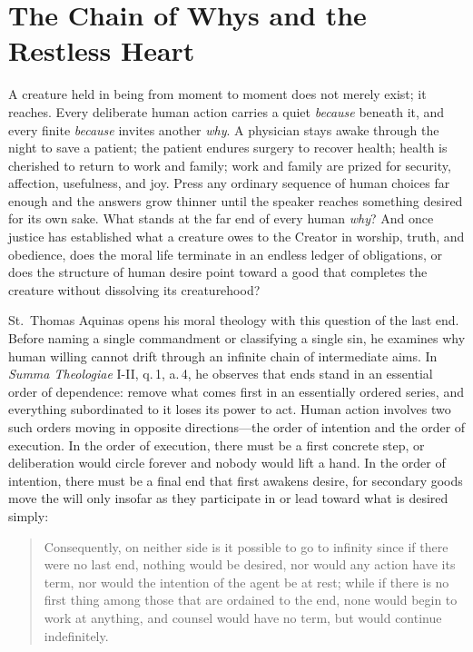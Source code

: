 \section{The Chain of Whys and the Restless Heart}

A creature held in being from moment to moment does not merely exist; it reaches. Every deliberate human action carries a quiet \emph{because} beneath it, and every finite \emph{because} invites another \emph{why}. A physician stays awake through the night to save a patient; the patient endures surgery to recover health; health is cherished to return to work and family; work and family are prized for security, affection, usefulness, and joy. Press any ordinary sequence of human choices far enough and the answers grow thinner until the speaker reaches something desired for its own sake. What stands at the far end of every human \emph{why}? And once justice has established what a creature owes to the Creator in worship, truth, and obedience, does the moral life terminate in an endless ledger of obligations, or does the structure of human desire point toward a good that completes the creature without dissolving its creaturehood?

St.\ Thomas Aquinas opens his moral theology with this question of the last end. Before naming a single commandment or classifying a single sin, he examines why human willing cannot drift through an infinite chain of intermediate aims. In \emph{Summa Theologiae} I-II, q.\,1, a.\,4, he observes that ends stand in an essential order of dependence: remove what comes first in an essentially ordered series, and everything subordinated to it loses its power to act. Human action involves two such orders moving in opposite directions---the order of intention and the order of execution. In the order of execution, there must be a first concrete step, or deliberation would circle forever and nobody would lift a hand. In the order of intention, there must be a final end that first awakens desire, for secondary goods move the will only insofar as they participate in or lead toward what is desired simply:

\begin{quote}
Consequently, on neither side is it possible to go to infinity since if there were no last end, nothing would be desired, nor would any action have its term, nor would the intention of the agent be at rest; while if there is no first thing among those that are ordained to the end, none would begin to work at anything, and counsel would have no term, but would continue indefinitely.
\end{quote}

